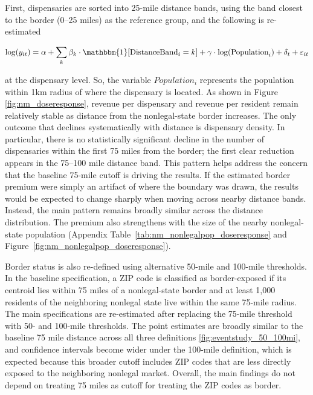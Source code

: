 \documentclass[english,12pt]{article}
\begin{document}
First, dispensaries are sorted into 25-mile distance bands, using the band closest to the border (0--25 miles) as the reference group, and the following is re-estimated

\begin{equation}
\log(y_{it}) = \alpha + \sum_{k} \beta_k \cdot \mathbbm{1}[\text{DistanceBand}_i = k] + \gamma\cdot\log(\text{Population}_i) + \delta_t + \varepsilon_{it}
\end{equation}

at the dispensary level. So, the variable $Population_i$ represents the population within 1km radius of where the dispensary is located. As shown in Figure \ref{fig:nm_doseresponse}, revenue per dispensary and revenue per resident remain relatively stable as distance from the nonlegal-state border increases. The only outcome that declines systematically with distance is dispensary density. In particular, there is no statistically significant decline in the number of dispensaries within the first 75 miles from the border; the first clear reduction appears in the 75--100 mile distance band. This pattern helps address the concern that the baseline 75-mile cutoff is driving the results. If the estimated border premium were simply an artifact of where the boundary was drawn, the results would be expected to change sharply when moving across nearby distance bands. Instead, the main pattern remains broadly similar across the distance distribution. The premium also strengthens with the size of the nearby nonlegal-state population (Appendix Table~\ref{tab:nm_nonlegalpop_doseresponse} and Figure~\ref{fig:nm_nonlegalpop_doseresponse}).

Border status is also re-defined using alternative 50-mile and 100-mile thresholds. In the baseline specification, a ZIP code is classified as border-exposed if its centroid lies within 75 miles of a nonlegal-state border and at least 1,000 residents of the neighboring nonlegal state live within the same 75-mile radius. The main specifications are re-estimated after replacing the 75-mile threshold with 50- and 100-mile thresholds. The point estimates are broadly similar to the baseline 75 mile distance across all three definitions \ref{fig:eventstudy_50_100mi}, and confidence intervals become wider under the 100-mile definition, which is expected because this broader cutoff includes ZIP codes that are less directly exposed to the neighboring nonlegal market. Overall, the main findings do not depend on treating 75 miles as cutoff for treating the ZIP codes as border. 
\end{document}
